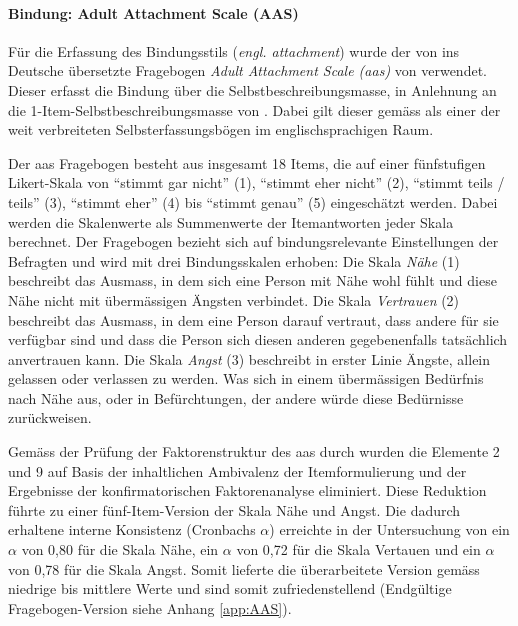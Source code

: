 \paragraph{Bindung: Adult Attachment Scale (AAS)}\label{sec:AAS}
Für die Erfassung des Bindungsstils (\textit{engl. attachment}) wurde der von  ins Deutsche übersetzte Fragebogen \textit{Adult Attachment Scale (\acrshort{aas})} von  verwendet. Dieser erfasst die Bindung über die Selbstbeschreibungsmasse, in Anlehnung an die 1-Item-Selbst\-beschreibungs\-masse von . Dabei gilt dieser gemäss  als einer der weit verbreiteten Selbst\-er\-fassungs\-bögen im englisch\-sprachigen Raum.

Der \acrshort{aas} Fragebogen besteht aus insgesamt 18 Items, die auf einer fünfstufigen Likert-Skala von \enquote{stimmt gar nicht} (1), \enquote{stimmt eher nicht} (2), \enquote{stimmt teils / teils} (3), \enquote{stimmt eher} (4) bis \enquote{stimmt genau} (5) eingeschätzt werden. Dabei werden die Skalenwerte als Summenwerte der Itemantworten jeder Skala berechnet. Der Fragebogen bezieht sich auf bindungsrelevante Einstellungen der Befragten und wird mit drei Bindungsskalen erhoben: Die Skala \textit{Nähe} (1) beschreibt das Ausmass, in dem sich eine Person mit Nähe wohl fühlt und diese Nähe nicht mit übermässigen Ängsten verbindet. Die Skala \textit{Vertrauen} (2) beschreibt das Ausmass, in dem eine Person darauf vertraut, dass andere für sie verfügbar sind und dass die Person sich diesen anderen gegebenenfalls tatsächlich anvertrauen kann. Die Skala \textit{Angst} (3) beschreibt in erster Linie Ängste, allein gelassen oder verlassen zu werden. Was sich in einem übermässigen Bedürfnis nach Nähe aus, oder in Befürchtungen, der andere würde diese Bedürnisse zurückweisen. 

Gemäss der Prüfung der Faktorenstruktur des \acrshort{aas} durch  wurden die Elemente 2 und 9 auf Basis der inhaltlichen Ambivalenz der Itemformulierung und der Ergebnisse der konfirmatorischen Faktorenanalyse eliminiert. Diese Reduktion führte zu einer fünf-Item-Version der Skala Nähe und Angst. Die dadurch erhaltene interne Konsistenz (Cronbachs $\alpha$) erreichte in der Untersuchung von  ein $\alpha$ von 0,80 für die Skala Nähe, ein $\alpha$ von 0,72 für die Skala Vertauen und ein $\alpha$ von 0,78 für die Skala Angst. Somit lieferte die überarbeitete Version gemäss  niedrige bis mittlere Werte und sind somit zufriedenstellend (Endgültige Fragebogen-Version siehe Anhang \ref{app:AAS}).

